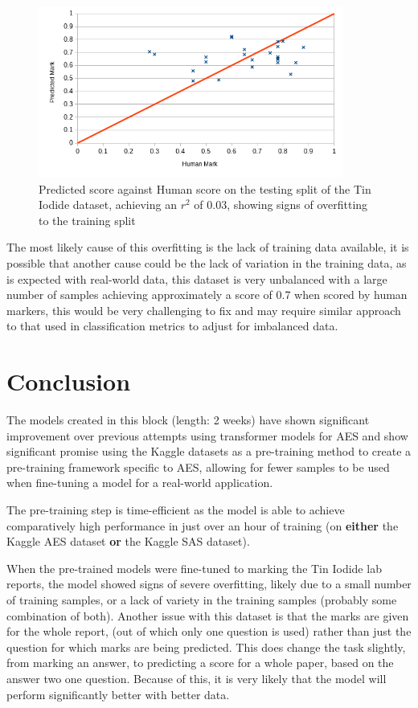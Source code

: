 \documentclass[11pt]{article}
\begin{document}
\begin{figure}[htbp]
\centering
\includegraphics[width=10cm]{./exp5_fine_dist.png}
\caption{Predicted score against Human score on the testing split of the Tin Iodide dataset, achieving an \(r^2\) of \(0.03\), showing signs of overfitting to the training split}
\end{figure}

The most likely cause of this overfitting is the lack of training data available, it is possible that another cause could be the lack of variation in the training data, as is expected with real-world data, this dataset is very unbalanced with a large number of samples achieving approximately a score of 0.7 when scored by human markers, this would be very challenging to fix and may require similar approach to that used in classification metrics to adjust for imbalanced data.

\section{Conclusion}
\label{sec:org5fc8a37}
The models created in this block (length: 2 weeks) have shown significant improvement over previous attempts using transformer models for AES and show significant promise using the Kaggle datasets as a pre-training method to create a pre-training framework specific to AES, allowing for fewer samples to be used when fine-tuning a model for a real-world application.

The pre-training step is time-efficient as the model is able to achieve comparatively high performance in just over an hour of training (on \textbf{\textbf{either}} the Kaggle AES dataset \textbf{\textbf{or}} the Kaggle SAS dataset).

When the pre-trained models were fine-tuned to marking the Tin Iodide lab reports, the model showed signs of severe overfitting, likely due to a small number of training samples, or a lack of variety in the training samples (probably some combination of both). Another issue with this dataset is that the marks are given for the whole report, (out of which only one question is used) rather than just the question for which marks are being predicted. This does change the task slightly, from marking an answer, to predicting a score for a whole paper, based on the answer two one question. Because of this, it is very likely that the model will perform significantly better with better data.
\end{document}
